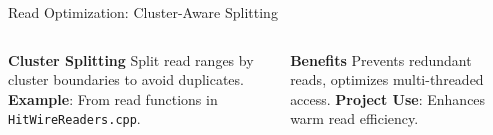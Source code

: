 \documentclass[aspectratio=169]{beamer}
\begin{document}
\begin{frame}{Read Optimization: Cluster-Aware Splitting}
  \begin{columns}
    \textbf{Cluster Splitting}
    \small Split read ranges by cluster boundaries to avoid duplicates.
    \vspace{0.5em}
    \vspace{0.5em}
    \textbf{Example}: From read functions in \texttt{HitWireReaders.cpp}.

    \textbf{Benefits}
    \small Prevents redundant reads, optimizes multi-threaded access.
    \vspace{0.5em}
    \vspace{0.5em}
    \textbf{Project Use}: Enhances warm read efficiency.
  \end{columns}
\end{frame}
\end{document}
